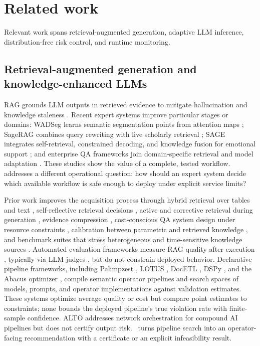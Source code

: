\section{Related work}
\label{sec:related}

Relevant work spans retrieval-augmented generation, adaptive LLM
inference, distribution-free risk control, and runtime monitoring.

\subsection{Retrieval-augmented generation and knowledge-enhanced LLMs}
RAG grounds LLM outputs in retrieved evidence to mitigate hallucination
and knowledge staleness \citep{lewis2020rag,gao2024ragsurvey,
yang2025integrating}. Recent expert systems improve particular stages
or domains: WADSeg learns semantic segmentation points from attention
maps \citep{guo2026wadseg}; SageRAG combines query rewriting with live
scholarly retrieval \citep{vidyarthi2026sagerag}; SAGE integrates
self-retrieval, constrained decoding, and knowledge fusion for
emotional support \citep{yang2026sage}; and enterprise QA frameworks
join domain-specific retrieval and model adaptation
\citep{jiang2026enterpriseqa}. These studies show the value of a
complete, tested workflow. \system addresses a different operational
question: how should an expert system decide which available workflow
is safe enough to deploy under explicit service limits?

Prior work improves the acquisition process
through hybrid retrieval
over tables and text \citep{chen2020hybridqa}, self-reflective
retrieval decisions \citep{asai2024selfrag}, active and corrective
retrieval during generation
\citep{jiang2023flare,yan2024corrective}, evidence compression
\citep{xu2024recomp}, cost-conscious QA system design under resource
constraints \citep{budur2024openqa}, calibration between parametric
and retrieved knowledge \citep{deng2026collaborative}, and benchmark
suites that
stress heterogeneous and time-sensitive knowledge sources
\citep{yang2024cragbench,stelmakh2022asqa,amouyal2022qampari,
gao2023alce,chen2024rgb}. Automated evaluation frameworks measure RAG
quality after execution
\citep{es2024ragas,saadfalcon2024ares,ru2024ragchecker,tang2024minicheck}, typically via
LLM judges \citep{zheng2023judging}, but do not constrain deployed
behavior. Declarative pipeline frameworks, including Palimpzest
\citep{liu2025palimpzest}, LOTUS \citep{patel2024lotus}, DocETL
\citep{shankar2024docetl}, DSPy \citep{khattab2023dspy}, and the
Abacus optimizer \citep{russo2025abacus}, compile semantic operator
pipelines and search spaces of models, prompts, and operator
implementations against validation estimates. These systems optimize
average quality or cost but compare point estimates to constraints;
none bounds the deployed pipeline's true violation rate with
finite-sample confidence. ALTO \citep{santhanam2024alto} addresses
network orchestration for compound AI pipelines but does not certify
output risk. \system\ turns pipeline search into an operator-facing
recommendation with a certificate or an explicit infeasibility result.

